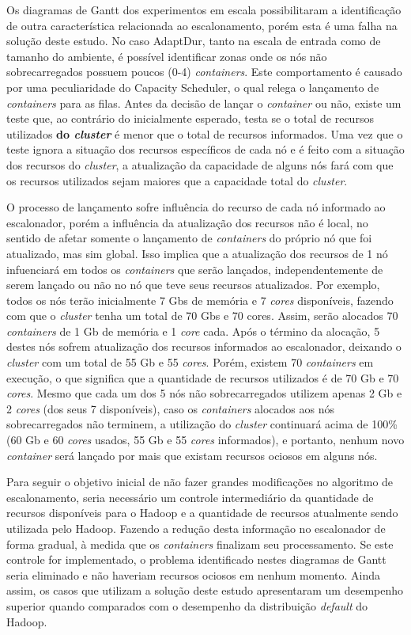 Os diagramas de Gantt dos experimentos em escala possibilitaram a identificação de outra característica relacionada ao escalonamento, porém esta é uma falha na solução deste estudo. No caso AdaptDur, tanto na escala de entrada como de tamanho do ambiente, é possível identificar zonas onde os nós não sobrecarregados possuem poucos (0-4) \textit{containers}. Este comportamento é causado por uma peculiaridade do Capacity Scheduler, o qual relega o lançamento de \textit{containers} para as filas. Antes da decisão de lançar o \textit{container} ou não, existe um teste que, ao contrário do inicialmente esperado, testa se o total de recursos utilizados \textbf{do \textit{cluster}} é menor que o total de recursos informados. Uma vez que o teste ignora a situação dos recursos específicos de cada nó e é feito com a situação dos recursos do \textit{cluster}, a atualização da capacidade de alguns nós fará com que os recursos utilizados sejam maiores que a capacidade total do \textit{cluster}.

O processo de lançamento sofre influência do recurso de cada nó informado ao escalonador, porém a influência da atualização dos recursos não é local, no sentido de afetar somente o lançamento de \textit{containers} do próprio nó que foi atualizado, mas sim global. Isso implica que a atualização dos recursos de 1 nó infuenciará em todos os \textit{containers} que serão lançados, independentemente de serem lançado ou não no nó que teve seus recursos atualizados. Por exemplo, todos os nós terão inicialmente 7 Gbs de memória e 7 \textit{cores} disponíveis, fazendo com que o \textit{cluster} tenha um total de 70 Gbs e 70 cores. Assim, serão alocados 70 \textit{containers} de 1 Gb de memória e 1 \textit{core} cada. Após o término da alocação, 5 destes nós sofrem atualização dos recursos informados ao escalonador, deixando o \textit{cluster} com um total de 55 Gb e 55 \textit{cores}. Porém, existem 70 \textit{containers} em execução, o que significa que a quantidade de recursos utilizados é de  70 Gb e 70 \textit{cores}. Mesmo que cada um dos 5 nós não sobrecarregados utilizem apenas 2 Gb e 2 \textit{cores} (dos seus 7 disponíveis), caso os \textit{containers} alocados aos nós sobrecarregados não terminem, a utilização do \textit{cluster} continuará acima de 100\% (60 Gb e 60 \textit{cores} usados, 55 Gb e 55 \textit{cores} informados), e portanto, nenhum novo \textit{container} será lançado por mais que existam recursos ociosos em alguns nós.

Para seguir o objetivo inicial de não fazer grandes modificações no algoritmo de escalonamento, seria necessário um controle intermediário da quantidade de recursos disponíveis para o Hadoop e a quantidade de recursos atualmente sendo utilizada pelo Hadoop. Fazendo a redução desta informação no escalonador de forma gradual, à medida que os \textit{containers} finalizam seu processamento. Se este controle for implementado, o problema identificado nestes diagramas de Gantt seria eliminado e não haveriam recursos ociosos em nenhum momento. Ainda assim, os casos que utilizam a solução deste estudo apresentaram um desempenho superior quando comparados com o desempenho da distribuição \textit{default} do Hadoop.


